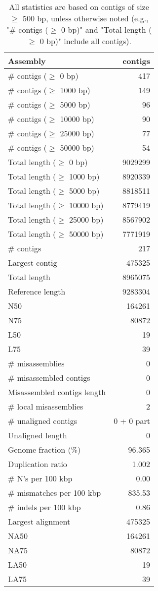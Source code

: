 \documentclass[12pt,a4paper]{article}
\begin{document}
\begin{table}[ht]
\begin{center}
\caption{All statistics are based on contigs of size $\geq$ 500 bp, unless otherwise noted (e.g., "\# contigs ($\geq$ 0 bp)" and "Total length ($\geq$ 0 bp)" include all contigs).}
\begin{tabular}{|l*{1}{|r}|}
\hline
Assembly & contigs \\ \hline
\# contigs ($\geq$ 0 bp) & 417 \\ \hline
\# contigs ($\geq$ 1000 bp) & 149 \\ \hline
\# contigs ($\geq$ 5000 bp) & 96 \\ \hline
\# contigs ($\geq$ 10000 bp) & 90 \\ \hline
\# contigs ($\geq$ 25000 bp) & 77 \\ \hline
\# contigs ($\geq$ 50000 bp) & 54 \\ \hline
Total length ($\geq$ 0 bp) & 9029299 \\ \hline
Total length ($\geq$ 1000 bp) & 8920339 \\ \hline
Total length ($\geq$ 5000 bp) & 8818511 \\ \hline
Total length ($\geq$ 10000 bp) & 8779419 \\ \hline
Total length ($\geq$ 25000 bp) & 8567902 \\ \hline
Total length ($\geq$ 50000 bp) & 7771919 \\ \hline
\# contigs & 217 \\ \hline
Largest contig & 475325 \\ \hline
Total length & 8965075 \\ \hline
Reference length & 9283304 \\ \hline
N50 & 164261 \\ \hline
N75 & 80872 \\ \hline
L50 & 19 \\ \hline
L75 & 39 \\ \hline
\# misassemblies & 0 \\ \hline
\# misassembled contigs & 0 \\ \hline
Misassembled contigs length & 0 \\ \hline
\# local misassemblies & 2 \\ \hline
\# unaligned contigs & 0 + 0 part \\ \hline
Unaligned length & 0 \\ \hline
Genome fraction (\%) & 96.365 \\ \hline
Duplication ratio & 1.002 \\ \hline
\# N's per 100 kbp & 0.00 \\ \hline
\# mismatches per 100 kbp & 835.53 \\ \hline
\# indels per 100 kbp & 0.86 \\ \hline
Largest alignment & 475325 \\ \hline
NA50 & 164261 \\ \hline
NA75 & 80872 \\ \hline
LA50 & 19 \\ \hline
LA75 & 39 \\ \hline
\end{tabular}
\end{center}
\end{table}
\end{document}

